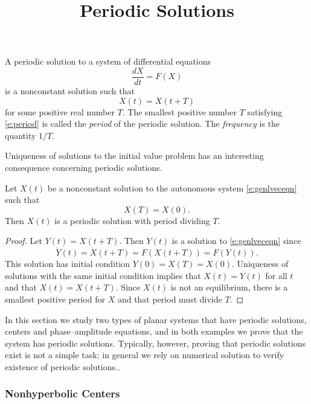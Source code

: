 \documentclass{ximera}
\title{Periodic Solutions}
\begin{document}
\begin{abstract}
\end{abstract}
\maketitle

 \label{S:periodic}

A periodic solution to a system of differential equations 
\begin{equation}  \label{e:genlveceqn}  
\frac{dX}{dt} = F(X)
\end{equation}
is a nonconstant solution such that 
\begin{equation}  \label{e:period}
X(t)=X(t+T)
\end{equation}
for some positive real number $T$.  The smallest positive number $T$
satisfying \eqref{e:period} is called the {\em period\/} 
of the periodic solution.  The {\em frequency\/} is 
the quantity $1/T$.
 
Uniqueness of solutions to the initial 
value problem has an interesting consequence concerning periodic solutions.
\begin{lemma}  
Let $X(t)$ be a nonconstant solution to the autonomous
system \eqref{e:genlveceqn} such that 
\[
X(T)=X(0).
\]
Then $X(t)$ is a periodic solution with period dividing $T$.
\end{lemma}

\begin{proof}  Let $Y(t)=X(t+T)$.  Then $Y(t)$ is a solution to 
\eqref{e:genlveceqn} since 
\[
\dot{Y}(t) = \dot{X}(t+T)=F(X(t+T))=F(Y(t)).
\]
This solution has initial condition $Y(0)=X(T)=X(0)$.  
Uniqueness of solutions with the same initial condition 
implies that $X(t)=Y(t)$ for all $t$ and that $X(t)=X(t+T)$.
Since $X(t)$ is not an equilibrium, there is a smallest 
positive period for $X$ and that period must divide $T$. \end{proof}

In this section we study two types of planar systems that have periodic 
solutions, centers and phase--amplitude equations, and in both examples 
we prove that the system has periodic solutions.  Typically, however, 
proving that periodic solutions exist is not a simple task; in general 
we rely on numerical solution to verify existence of periodic solutions..




\subsubsection*{Nonhyperbolic Centers}
\end{document}

